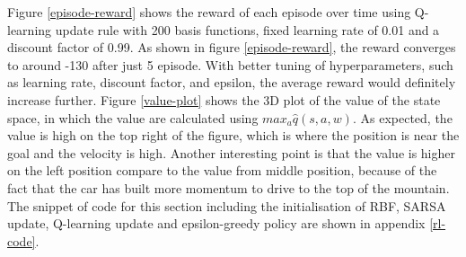 \documentclass[12pt,letterpaper]{article}
\begin{document}
Figure \ref{episode-reward} shows the reward of each episode over time using Q-learning update rule
with 200 basis functions, fixed learning rate of 0.01 and a discount factor of 0.99. 
As shown in figure \ref{episode-reward}, the reward converges to around -130 after just 5 episode.
With better tuning of hyperparameters, such as learning rate, discount factor, and epsilon, 
the average reward would definitely increase further. 
Figure \ref{value-plot} shows the 3D plot of the value of the state space, in which
the value are calculated using $max_a \hat{q}(s,a,w)$.
As expected, the value is high on the top right of the figure, which is where the position is near the goal and the velocity is high.
Another interesting point is that the value is higher on the left position compare to the value from middle position, 
because of the fact that the car has built more momentum to drive to the top of the mountain.
The snippet of code for this section including the initialisation of RBF, SARSA update,
Q-learning update and epsilon-greedy policy are shown in appendix \ref{rl-code}.
\end{document}

